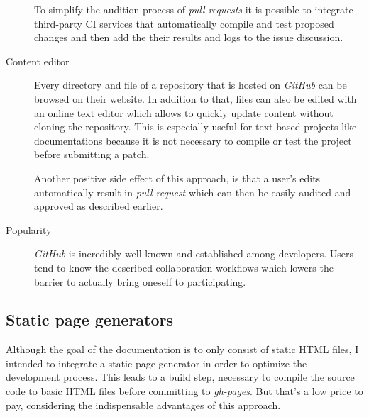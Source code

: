 \begin{description}
	To simplify the audition process of \textit{pull-requests} it is possible to integrate third-party \ac{CI} services that automatically compile and test proposed changes and then add the their results and logs to the issue discussion.

	\item[Content editor]\hfill

	Every directory and file of a repository that is hosted on \textit{GitHub} can be browsed on their website. In addition to that, files can also be edited with an online text editor which allows to quickly update content without cloning the repository. This is especially useful for text-based projects like documentations because it is not necessary to compile or test the project before submitting a patch.

	Another positive side effect of this approach, is that a user's edits automatically result in \textit{pull-request} which can then be easily audited and approved as described earlier.

	\item[Popularity]\hfill

	\textit{GitHub} is incredibly well-known and established among developers. Users tend to know the described collaboration workflows which lowers the barrier to actually bring oneself to participating.

\end{description}

\subsection{Static page generators}

Although the goal of the documentation is to only consist of static \ac{HTML} files, I intended to integrate a static page generator in order to optimize the development process. This leads to a build step, necessary to compile the source code to basic \ac{HTML} files before committing to \textit{gh-pages}. But that's a low price to pay, considering the indispensable advantages of this approach.

